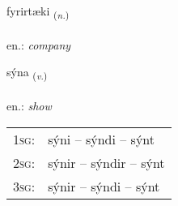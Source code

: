 \documentclass[frontgrid, backgrid]{flacards}\usepackage[]{graphicx}\usepackage[]{xcolor}
\begin{document}
\renewcommand{\flhead}{\vskip5pt \fboxsep=0pt {\small\bfseries\footnotesize Nafnorð | Noun}}
\renewcommand{\fcfoot}{\vskip5pt \fboxsep=0pt \hspace{2pt}{\small\bfseries\footnotesize 1K}}

\renewcommand{\blhead}{\vskip5pt {\small\bfseries\footnotesize Nafnorð | Noun }}
\renewcommand{\bcfoot}{\vskip5pt \hspace{2pt}{\small\bfseries\footnotesize 1K}}


{fyrirtæki \small{\textsubscript{(\textit{n.})}} \\[1ex] %
 \\
en.: \emph{company} \\  [2ex]
\renewcommand*{\arraystretch}{0.8}
}

\renewcommand{\flhead}{\vskip5pt \fboxsep=0pt {\small\bfseries\footnotesize Sagnorð | Verb}}
\renewcommand{\fcfoot}{\vskip5pt \fboxsep=0pt \hspace{2pt}{\small\bfseries\footnotesize 1K}}

\renewcommand{\blhead}{\vskip5pt {\small\bfseries\footnotesize Sagnorð | Verb }}
\renewcommand{\bcfoot}{\vskip5pt \hspace{2pt}{\small\bfseries\footnotesize 1K}}


{sýna \small{\textsubscript{(\textit{v.})}} \\[1ex] %
\textphonetic{[siːna]} \\
en.: \emph{show} \\  [2ex]
\renewcommand*{\arraystretch}{0.8}
\begin{tabular}{p{1cm}l}
\textsc{1sg}: & sýni -- sýndi -- sýnt \\ 
\textsc{2sg}: & sýnir -- sýndir -- sýnt \\ 
\textsc{3sg}: & sýnir -- sýndi -- sýnt \\ 
\end{tabular}
}
\end{document}
